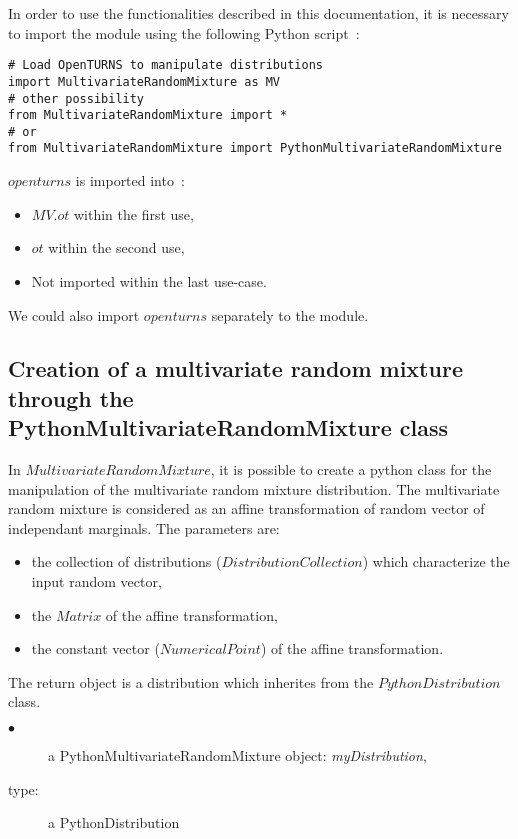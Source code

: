 In order to use the functionalities described in this documentation, it is necessary to import the module 
using the following Python script~:

\begin{lstlisting}
# Load OpenTURNS to manipulate distributions
import MultivariateRandomMixture as MV
# other possibility
from MultivariateRandomMixture import *
# or
from MultivariateRandomMixture import PythonMultivariateRandomMixture
\end{lstlisting}
$openturns$ is imported into~: 
\begin{itemize}
   \item $MV.ot$ within the first use,
   \item $ot$ within the second use,
   \item Not imported within the last use-case.
\end{itemize}

We could also import $openturns$ separately to the module.


\subsection{Creation of a multivariate random mixture through the PythonMultivariateRandomMixture class} \label{MVRM}

In $MultivariateRandomMixture$, it is possible to create a python class for the manipulation of the multivariate random mixture distribution.
The multivariate random mixture is considered as an affine transformation of random vector of independant marginals. 
The parameters are:
\begin{itemize}
 \item the collection of distributions ($DistributionCollection$) which characterize the input random vector,
 \item the $Matrix$ of the affine transformation, 
 \item the constant vector ($NumericalPoint$) of the affine transformation.
\end{itemize}

The return object is a distribution which inherites from the $PythonDistribution$ class.\\
{
  \begin{description}
  \item[$\bullet$] a PythonMultivariateRandomMixture object: {\itshape myDistribution},
  \item[type:] a PythonDistribution
  \end{description}
}
\espace

